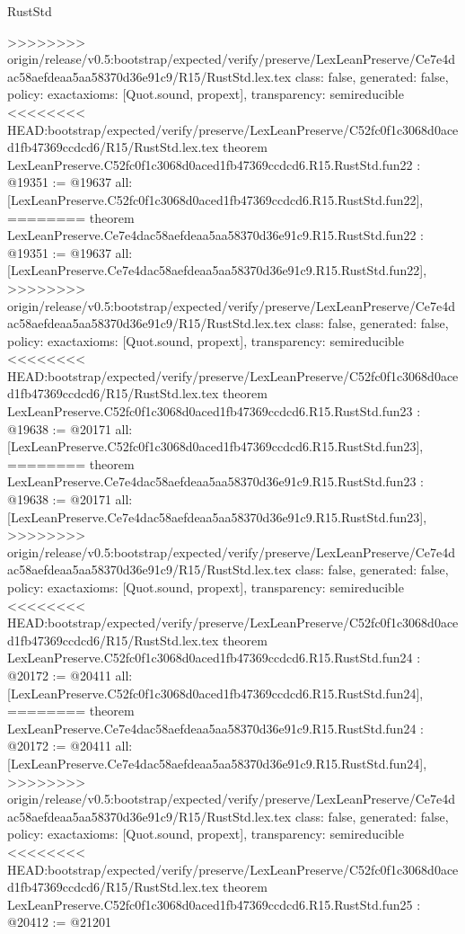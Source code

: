 \begin{lexlean}{RustStd}
\begin{coremodule}
{\begin{coremodule}
{{{{{{{{{{{{{{{{{{{{{{{{{>>>>>>>> origin/release/v0.5:bootstrap/expected/verify/preserve/LexLeanPreserve/Ce7e4dac58aefdeaa5aa58370d36e91c9/R15/RustStd.lex.tex
  class: false,
  generated: false,
  policy: exact{axioms: [Quot.sound, propext]},
  transparency: semireducible
}
<<<<<<<< HEAD:bootstrap/expected/verify/preserve/LexLeanPreserve/C52fc0f1c3068d0aced1fb47369ccdcd6/R15/RustStd.lex.tex
theorem LexLeanPreserve.C52fc0f1c3068d0aced1fb47369ccdcd6.R15.RustStd.fun22 : @19351 := @19637 {
  all: [LexLeanPreserve.C52fc0f1c3068d0aced1fb47369ccdcd6.R15.RustStd.fun22],
========
theorem LexLeanPreserve.Ce7e4dac58aefdeaa5aa58370d36e91c9.R15.RustStd.fun22 : @19351 := @19637 {
  all: [LexLeanPreserve.Ce7e4dac58aefdeaa5aa58370d36e91c9.R15.RustStd.fun22],
>>>>>>>> origin/release/v0.5:bootstrap/expected/verify/preserve/LexLeanPreserve/Ce7e4dac58aefdeaa5aa58370d36e91c9/R15/RustStd.lex.tex
  class: false,
  generated: false,
  policy: exact{axioms: [Quot.sound, propext]},
  transparency: semireducible
}
<<<<<<<< HEAD:bootstrap/expected/verify/preserve/LexLeanPreserve/C52fc0f1c3068d0aced1fb47369ccdcd6/R15/RustStd.lex.tex
theorem LexLeanPreserve.C52fc0f1c3068d0aced1fb47369ccdcd6.R15.RustStd.fun23 : @19638 := @20171 {
  all: [LexLeanPreserve.C52fc0f1c3068d0aced1fb47369ccdcd6.R15.RustStd.fun23],
========
theorem LexLeanPreserve.Ce7e4dac58aefdeaa5aa58370d36e91c9.R15.RustStd.fun23 : @19638 := @20171 {
  all: [LexLeanPreserve.Ce7e4dac58aefdeaa5aa58370d36e91c9.R15.RustStd.fun23],
>>>>>>>> origin/release/v0.5:bootstrap/expected/verify/preserve/LexLeanPreserve/Ce7e4dac58aefdeaa5aa58370d36e91c9/R15/RustStd.lex.tex
  class: false,
  generated: false,
  policy: exact{axioms: [Quot.sound, propext]},
  transparency: semireducible
}
<<<<<<<< HEAD:bootstrap/expected/verify/preserve/LexLeanPreserve/C52fc0f1c3068d0aced1fb47369ccdcd6/R15/RustStd.lex.tex
theorem LexLeanPreserve.C52fc0f1c3068d0aced1fb47369ccdcd6.R15.RustStd.fun24 : @20172 := @20411 {
  all: [LexLeanPreserve.C52fc0f1c3068d0aced1fb47369ccdcd6.R15.RustStd.fun24],
========
theorem LexLeanPreserve.Ce7e4dac58aefdeaa5aa58370d36e91c9.R15.RustStd.fun24 : @20172 := @20411 {
  all: [LexLeanPreserve.Ce7e4dac58aefdeaa5aa58370d36e91c9.R15.RustStd.fun24],
>>>>>>>> origin/release/v0.5:bootstrap/expected/verify/preserve/LexLeanPreserve/Ce7e4dac58aefdeaa5aa58370d36e91c9/R15/RustStd.lex.tex
  class: false,
  generated: false,
  policy: exact{axioms: [Quot.sound, propext]},
  transparency: semireducible
}
<<<<<<<< HEAD:bootstrap/expected/verify/preserve/LexLeanPreserve/C52fc0f1c3068d0aced1fb47369ccdcd6/R15/RustStd.lex.tex
theorem LexLeanPreserve.C52fc0f1c3068d0aced1fb47369ccdcd6.R15.RustStd.fun25 : @20412 := @21201 {
}}}}}}}}}}}}}}}}}}}}}}}}}}}}
\end{coremodule}}
\end{coremodule}
\end{lexlean}
